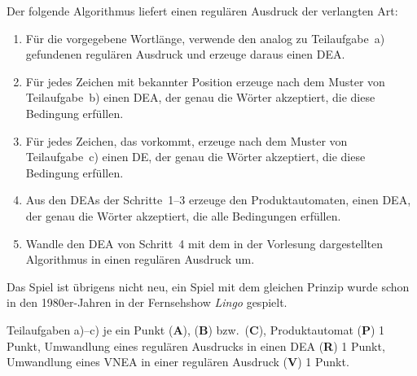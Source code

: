 \begin{loesung}
\begin{teilaufgaben}
\begin{center}
\end{center}
\item
Der folgende Algorithmus liefert einen regulären Ausdruck der
verlangten Art:
\begin{enumerate}[1.]
\item
Für die vorgegebene Wortlänge, verwende den analog zu Teilaufgabe~a)
gefundenen regulären Ausdruck und erzeuge daraus einen DEA.
\item
Für jedes Zeichen mit bekannter Position erzeuge nach dem Muster von
Teilaufgabe~b) einen DEA, der genau die Wörter akzeptiert, die diese
Bedingung erfüllen.
\item
Für jedes Zeichen, das vorkommt, erzeuge nach dem Muster von
Teilaufgabe~c) einen DE, der genau die Wörter akzeptiert, die diese
Bedingung erfüllen.
\item
Aus den DEAs der Schritte~1--3 erzeuge den Produktautomaten, einen DEA,
der genau die Wörter akzeptiert, die alle Bedingungen erfüllen.
\item
Wandle den DEA von Schritt~4 mit dem in der Vorlesung dargestellten
Algorithmus in einen regulären Ausdruck um.
\qedhere
\end{enumerate}
\end{teilaufgaben}
\end{loesung}

\begin{diskussion}
Das Spiel ist übrigens nicht neu, ein Spiel mit dem gleichen Prinzip
wurde schon in den 1980er-Jahren in der Fernsehshow {\em Lingo} gespielt.
\end{diskussion}

\begin{bewertung}
Teilaufgaben a)--c) je ein Punkt ({\bf A}), ({\bf B}) bzw.~({\bf C}),
Produktautomat ({\bf P}) 1 Punkt,
Umwandlung eines regulären Ausdrucks in einen DEA ({\bf R}) 1 Punkt,
Umwandlung eines VNEA in einer regulären Ausdruck ({\bf V}) 1 Punkt.
\end{bewertung}

